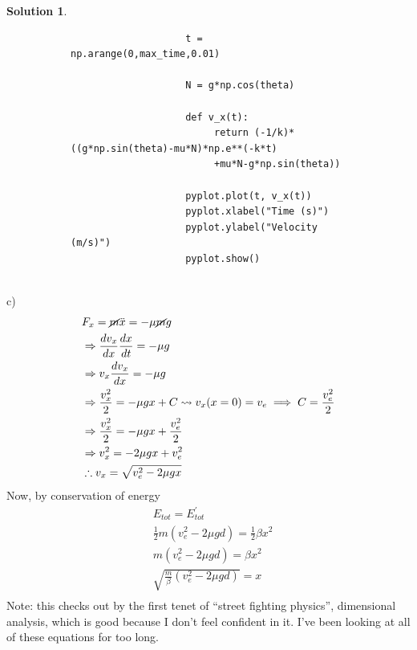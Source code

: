 \documentclass[10pt]{article}
\theoremstyle{definition}
\newtheorem{soln}{Solution}
\begin{document}
\begin{soln}
\begin{figure}[h]
\begin{subfigure}[t]{0.49\textwidth}
\begin{verbatim}
                    t = np.arange(0,max_time,0.01)

                    N = g*np.cos(theta)

                    def v_x(t):
                         return (-1/k)*((g*np.sin(theta)-mu*N)*np.e**(-k*t)
                         +mu*N-g*np.sin(theta))

                    pyplot.plot(t, v_x(t))
                    pyplot.xlabel("Time (s)")
                    pyplot.ylabel("Velocity (m/s)")
                    pyplot.show()
               \end{verbatim}
          \end{subfigure}%
     \end{figure} ~\\
     c)
     \begin{align*}
           & F_x=\cancel{m}\ddot{x}=-\mu \cancel{m}g                                                        \\
           & \Rightarrow \frac{dv_x}{dx}\frac{dx}{dt}=-\mu g                                                \\
           & \Rightarrow v_x\frac{dv_x}{dx}=-\mu g                                                          \\
           & \Rightarrow \frac{v_x^2}{2}=-\mu gx+C \rightsquigarrow v_x(x=0)=v_e \implies C=\frac{v_e^2}{2} \\
           & \Rightarrow \frac{v_x^2}{2}=-\mu gx+\frac{v_e^2}{2}                                            \\
           & \Rightarrow v_x^2=-2\mu gx+v_e^2                                                               \\
           & \therefore v_x=\sqrt{v_e^2-2\mu gx}                                                            \\
     \end{align*}
     Now, by conservation of energy
     \begin{align*}
           & E_{tot}=E_{tot}^\prime                           \\
           & \frac{1}{2}m(v_e^2-2\mu gd)=\frac{1}{2}\beta x^2 \\
           & m(v_e^2-2\mu gd)=\beta x^2                       \\
           & \sqrt{\frac{m}{\beta}(v_e^2-2\mu gd)}=x          \\
     \end{align*}
     Note: this checks out by the first tenet of ``street fighting physics'', dimensional analysis, which is good because I don't feel confident in it. I've been looking at all of these equations
     for too long.
\end{soln}
\end{document}

